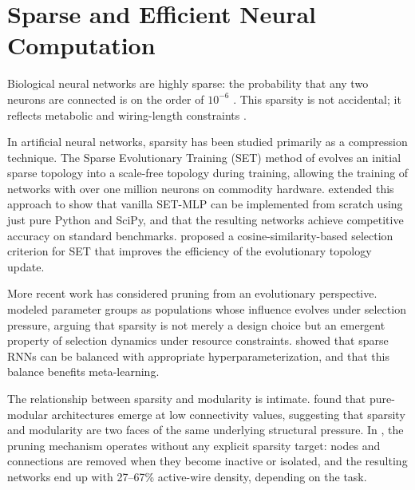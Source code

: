 \section{Sparse and Efficient Neural Computation}
\label{sec:sparse}

Biological neural networks are highly sparse: the probability that any two
neurons are connected is on the order of $10^{-6}$ \citep{lecun2015deep}.
This sparsity is not accidental; it reflects metabolic and wiring-length
constraints \citep{chklovskii2004wiring, cherniak1994component}.

In artificial neural networks, sparsity has been studied primarily as a
compression technique. The Sparse Evolutionary Training (SET) method of
\citet{mocanu2018scalable} evolves an initial sparse topology into a
scale-free topology during training, allowing the training of networks with
over one million neurons on commodity hardware. \citet{liu2019sparse}
extended this approach to show that vanilla SET-MLP can be implemented from
scratch using just pure Python and SciPy, and that the resulting networks
achieve competitive accuracy on standard benchmarks.
\citet{2019cosine} proposed a cosine-similarity-based selection criterion for
SET that improves the efficiency of the evolutionary topology update.

More recent work has considered pruning from an evolutionary perspective.
\citet{shah2026pruning} modeled parameter groups as populations whose
influence evolves under selection pressure, arguing that sparsity is not
merely a design choice but an emergent property of selection dynamics under
resource constraints. \citet{hershey2025balancing} showed that sparse RNNs can
be balanced with appropriate hyperparameterization, and that this balance
benefits meta-learning.

The relationship between sparsity and modularity is intimate.
\citet{landassuri2012evolution} found that pure-modular architectures emerge
at low connectivity values, suggesting that sparsity and modularity are two
faces of the same underlying structural pressure. In \modnet{}, the pruning
mechanism operates without any explicit sparsity target: nodes and connections
are removed when they become inactive or isolated, and the resulting networks
end up with 27–67\% active-wire density, depending on the task.

